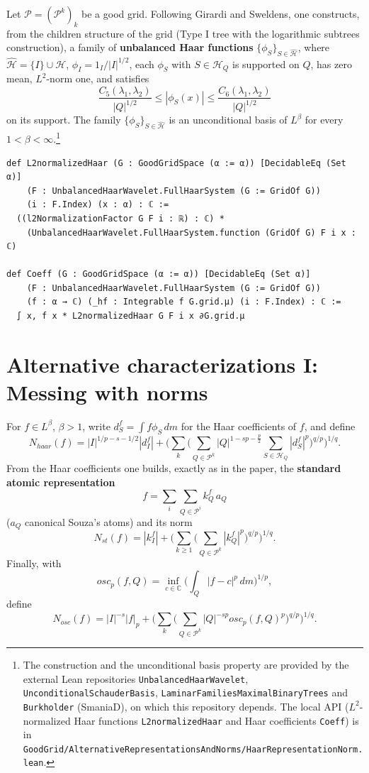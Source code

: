 \documentclass[11pt]{amsart}
\theoremstyle{definition}
\newcommand{\lean}[1]{\texttt{#1}}
\begin{document}
Let $\mathcal{P}=(\mathcal{P}^k)_k$ be a good grid. Following Girardi and
Sweldens, one constructs, from the children structure of the grid (Type I
tree with the logarithmic subtrees construction), a family of {\bf unbalanced
Haar functions} $\{\phi_S\}_{S\in \hat{\mathcal{H}}}$, where
$\hat{\mathcal{H}}=\{I\}\cup \mathcal{H}$, $\phi_I = 1_I/|I|^{1/2}$, each
$\phi_S$ with $S \in \mathcal{H}_Q$ is supported on $Q$, has zero mean,
$L^2$-norm one, and satisfies
$$\frac{C_5(\lambda_1,\lambda_2)}{|Q|^{1/2}} \leq |\phi_S(x)| \leq \frac{C_6(\lambda_1,\lambda_2)}{|Q|^{1/2}}$$
on its support. The family $\{\phi_S\}_{S\in \hat{\mathcal{H}}}$ is an
unconditional basis of $L^\beta$ for every $1<\beta<
\infty$.\footnote{The construction and the unconditional basis property are
provided by the external Lean repositories \lean{UnbalancedHaarWavelet},
\lean{UnconditionalSchauderBasis}, \lean{LaminarFamiliesMaximalBinaryTrees}
and \lean{Burkholder} (SmaniaD), on which this repository depends. The local
API ($L^2$-normalized Haar functions \lean{L2normalizedHaar} and Haar
coefficients \lean{Coeff}) is in
\lean{GoodGrid/AlternativeRepresentationsAndNorms/HaarRepresentationNorm.lean}.}
\begin{lstlisting}[style=lean]
def L2normalizedHaar (G : GoodGridSpace (α := α)) [DecidableEq (Set α)]
    (F : UnbalancedHaarWavelet.FullHaarSystem (G := GridOf G))
    (i : F.Index) (x : α) : ℂ :=
  ((l2NormalizationFactor G F i : ℝ) : ℂ) *
    (UnbalancedHaarWavelet.FullHaarSystem.function (GridOf G) F i x : ℂ)

def Coeff (G : GoodGridSpace (α := α)) [DecidableEq (Set α)]
    (F : UnbalancedHaarWavelet.FullHaarSystem (G := GridOf G))
    (f : α → ℂ) (_hf : Integrable f G.grid.μ) (i : F.Index) : ℂ :=
  ∫ x, f x * L2normalizedHaar G F i x ∂G.grid.μ
\end{lstlisting}

\section{Alternative characterizations I: Messing with norms}\label{alt1}

For $f\in L^\beta$, $\beta>1$, write $d_S^f = \int f \phi_S\,dm$ for the Haar
coefficients of $f$, and define
$$ N_{haar}(f)=|I|^{1/p-s-1/2} |d_I^f|+ \Big( \sum_{k} \big( \sum_{Q\in \mathcal{P}^{k}} |Q|^{1-sp-\frac{p}{2}} \sum_{S\in \mathcal{H}_Q} |d_S^f|^p\big)^{q/p} \Big)^{1/q}.$$
From the Haar coefficients one builds, exactly as in the paper, the
{\bf standard atomic representation}
$$f = \sum_i \sum_{Q\in \mathcal{P}^{i}} k_Q^f\, a_Q$$ ($a_Q$ canonical Souza's
atoms) and its norm
$$N_{st}(f)=|k_I^f|+ \Big( \sum_{k\geq 1} \big( \sum_{Q\in \mathcal{P}^{k}} |k_Q^f|^p \big)^{q/p}\Big)^{1/q}.$$
Finally, with
$$osc_p(f,Q)= \inf_{c \in \mathbb{C}} \Big(\int_Q |f-c|^p \, dm\Big)^{1/p},$$
define
$$N_{osc}(f)=|I|^{-s}|f|_p+\Big( \sum_k \big( \sum_{Q\in \mathcal{P}^k} |Q|^{-sp} osc_p(f,Q)^p \big)^{q/p} \Big)^{1/q}.$$
\end{document}
